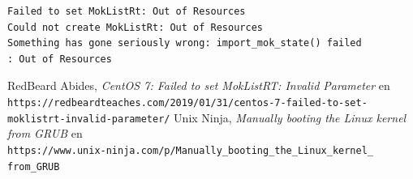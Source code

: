 \documentclass{article}
\begin{document}
\begin{verbatim}
Failed to set MokListRt: Out of Resources
Could not create MokListRt: Out of Resources
Something has gone seriously wrong: import_mok_state() failed
: Out of Resources
\end{verbatim}

\renewcommand\refname{Bibliografía}
\begin{thebibliography}{99}
    RedBeard Abides, \textit{CentOS 7: Failed to set MokListRT: 
    Invalid Parameter} en \\
    \texttt{https://redbeardteaches.com/2019/01/31/centos-7-failed-to-set-\\
    moklistrt-invalid-parameter/}
    Unix Ninja, \textit{Manually booting the Linux kernel from GRUB} en \\
    \texttt{https://www.unix-ninja.com/p/Manually\_booting\_the\_Linux\_kernel\_
    from\_GRUB}

\end{thebibliography}
\end{document}

